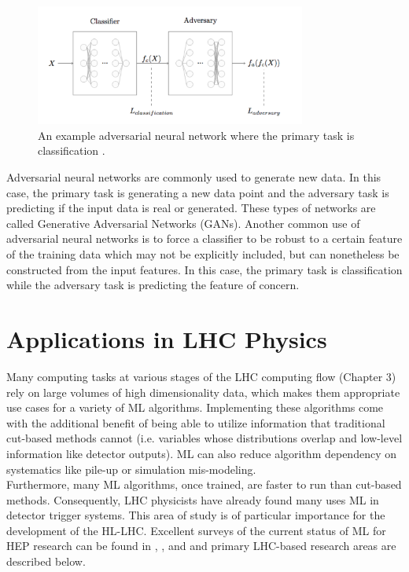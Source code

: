 \begin{figure}[htb!]
    \centering
    \includegraphics[width=3.5in]{figures/chapter4/ann.png}
    \caption{An example adversarial neural network where the primary task is classification \cite{pivot_paper}.}
    \label{fig:ann}
\end{figure}

Adversarial neural networks are commonly used to generate new data. In this case, the primary task is generating a new data point and the adversary task is predicting if the input data is real or generated. These types of networks are called Generative Adversarial Networks (GANs). Another common use of adversarial neural networks is to force a classifier to be robust to a certain feature of the training data which may not be explicitly included, but can nonetheless be constructed from the input features. In this case, the primary task is classification while the adversary task is predicting the feature of concern.\\

\section{Applications in LHC Physics}\label{sec:apps}
Many computing tasks at various stages of the LHC computing flow (Chapter 3) rely on large volumes of high dimensionality data, which makes them appropriate use cases for a variety of ML algorithms. Implementing these algorithms come with the additional benefit of being able to utilize information that traditional cut-based methods cannot (i.e. variables whose distributions overlap and low-level information like detector outputs). ML can also reduce algorithm dependency on systematics like pile-up or simulation mis-modeling.\\

Furthermore, many ML algorithms, once trained, are faster to run than cut-based methods. Consequently, LHC physicists have already found many uses ML in detector trigger systems. This area of study is of particular importance for the development of the HL-LHC. Excellent surveys of the current status of ML for HEP research can be found in \cite{dan_paper}, \cite{hepml_site}, and \cite{ml_whitepaper} and primary LHC-based research areas are described below.

